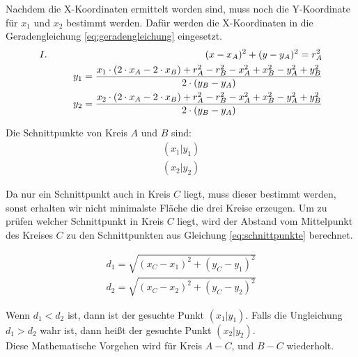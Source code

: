 Nachdem die X-Koordinaten ermittelt worden sind, muss noch die Y-Koordinate für $x_{1}$ und $x_{2}$ bestimmt werden. Dafür werden die X-Koordinaten in die Geradengleichung \ref{eq:geradengleichung} eingesetzt.
\begin{equation}\label{eq:y_errechnen}
\begin{split}
\RM{1} \hspace{5.7cm} (x-x_{A})^{2}+(y-y_{A})^{2} = r_{A}^{2} \\
\hspace{1cm} y_{1} = \frac{ x_{1} \cdot (2 \cdot x_{A} - 2 \cdot x_{B}) +  r_{A}^{2} - r_{B}^{2} - x_{A}^{2} + x_{B}^{2} - y_{A}^{2} + y_{B}^{2} }{2 \cdot (y_{B} - y_{A})}
\\
\hspace{1cm} y_{2} = \frac{ x_{2} \cdot (2 \cdot x_{A} - 2 \cdot x_{B}) +  r_{A}^{2} - r_{B}^{2} - x_{A}^{2} + x_{B}^{2} - y_{A}^{2} + y_{B}^{2} }{2 \cdot (y_{B} - y_{A})}
\end{split}
\end{equation}

Die Schnittpunkte von Kreis $A$ und $B$ sind:
\begin{equation}\label{eq:schnittpunkte}
\begin{split}
(x_{1} | y_{1})
\\
(x_{2} | y_{2})
\end{split}
\end{equation}

Da nur ein Schnittpunkt auch in Kreis $C$ liegt, muss dieser bestimmt werden, sonst erhalten wir nicht minimalste Fläche die drei Kreise erzeugen. Um zu prüfen welcher Schnittpunkt in Kreis $C$ liegt, wird der Abstand vom Mittelpunkt des Kreises $C$ zu den Schnittpunkten aus Gleichung \ref{eq:schnittpunkte} berechnet.


\begin{equation}\label{eq:schnittpunkt_der_im_kreis_liegt}
\begin{split}
d_{1} = \sqrt{(x_{C} - x_{1})^2 + (y_{C} - y_{1})^{2}}
\\
d_{2} = \sqrt{(x_{C} - x_{2})^2 + (y_{C} - y_{2})^{2}}
\end{split}
\end{equation}

Wenn $d_{1} < d_{2}$ ist, dann ist der gesuchte Punkt $(x_{1} | y_{1})$. Falls die Ungleichung $d_{1} > d_{2}$ wahr ist, dann heißt der gesuchte Punkt $(x_{2} | y_{2})$.
\\
Diese Mathematische Vorgehen wird für Kreis $A-C$, und $B-C$ wiederholt.

